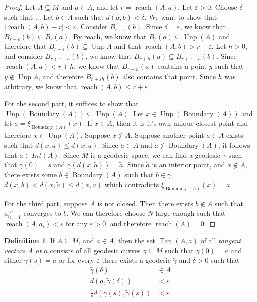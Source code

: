 \documentclass{article}
\theoremstyle{plain}
\theoremstyle{definition}
\newtheorem{defn}[thm]{Definition}
\renewcommand{\(}{\left(}
\renewcommand{\)}{\right)}
\DeclareMathOperator*{\reach}{reach}
\DeclareMathOperator*{\Tan}{Tan}
\DeclareMathOperator*{\Unp}{Unp}
\DeclareMathOperator*{\boundary}{Boundary}
\begin{document}
\begin{proof}
  Let $A \subseteq M$ and $a \in A$, and let $r = \reach(A,a)$.
  Let $\varepsilon > 0$.
  Choose $\delta$ such that ...
  Let $b \in A$ such that $d(a,b) < \delta$.
  We want to show that $\vert \reach(A,b) - r\vert < \varepsilon$.
  Consider $B_{r - \varepsilon}(b)$.
  Since $\delta = \varepsilon$, we know that $B_{r - \varepsilon}(b) \subseteq B_{r}(a)$.
  By reach, we know that $B_{r}(a) \subseteq \Unp(A)$ and therefore that $B_{r - \varepsilon}(b) \subseteq \Unp A$ and that $\reach(A,b) > r - \varepsilon$.
  Let $h > 0$, and consider $B_{r + \varepsilon + h}(b)$, we know that $B_{r+h}(a) \subseteq B_{r + \varepsilon + h}(b)$. Since $\reach(A,a) < r + h$, we know that $B_{r+h}(a)$ contains a point $y$ such that $y \notin \Unp A$, and therefore $B_{r + \varepsilon h}(b)$ also contains that point. Since $h$ was arbitrary, we know that $\reach(A,b) \leq r + \varepsilon$.

  For the second part, it suffices to show that $\Unp(\boundary(A)) \subseteq \Unp(A)$. Let $x \in \Unp(\boundary(A))$ and let $a = \xi_{\boundary(A)}(x)$. If $x \in A$, then it is it's own unique closest point and therefore $x \in \Unp(A)$.  Suppose $x \notin A$. Suppose another point $\tilde a \in A$ exists such that $d(x,\tilde a) \leq d(x, a)$. Since $\tilde a \in A$ and $\tilde a \notin \boundary(A)$, it follows that $\tilde a \in Int(A)$. Since $M$ is a geodesic space, we can find a geodesic $\gamma$ such that $\gamma(0) = s$ and $\gamma(d(x,\tilde a)) = \tilde a$. Since $\tilde a$ is an interior point, and $x \notin A$, there exists some $b \in \boundary(A)$ such that $b \in \gamma$. $d(x,b) < d(x,\tilde a) \leq d(x,a)$ which contradicts $\xi_{\boundary(A)}(x) = a$.

  For the third part, suppose $A$ is not closed. Then there exists $b \notin A$ such that ${a_i}_{i=1}^n$ converges to $b$. We can therefore choose $N$ large enough such that $\reach(A,a_i) < \varepsilon$ for any $\varepsilon > 0$, and therefore $\reach(A) = 0$.
\end{proof}

\begin{defn}
  If $A \subseteq M$, and $a \in A$, then the set $\Tan(A,a)$ of all \emph{tangent vectors $A$ at $a$} consists of all geodesic curves $\gamma \subseteq M$ such that $\gamma(0) = a$ and either $\gamma(s) = a$ or for every $\varepsilon$ there exists a geodesic $\tilde \gamma$ and $\delta > 0$ such that
  \begin{align*}
    \tilde \gamma(\delta) &\in A
    \\ d(a,\tilde\gamma(\delta)) &< \varepsilon
    \\ \frac{1}{s}d(\gamma(s), \tilde\gamma(s)) &< \varepsilon
  \end{align*}

\end{defn}
\end{document}
